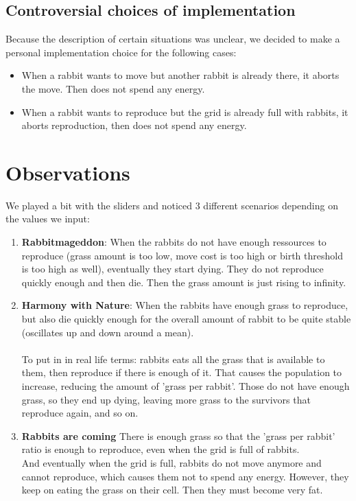 \documentclass[fontsize=11pt]{scrartcl} %
\begin{document}
\subsection*{Controversial choices of implementation}

Because the description of certain situations was unclear, we decided to make a personal implementation choice for the following cases:

\begin{itemize}

\item When a rabbit wants to move but another rabbit is already there, it aborts the move. Then does not spend any energy.

\item When a rabbit wants to reproduce but the grid is already full with rabbits, it aborts reproduction, then does not spend any energy.
\end{itemize}

\section*{Observations}

We played a bit with the sliders and noticed 3 different scenarios depending on the values we input:

\begin{enumerate}

\item \textbf{Rabbitmageddon}: When the rabbits do not have enough ressources to reproduce (grass amount is too low, move cost is too high or birth threshold is too high as well), eventually they start dying. They do not reproduce quickly enough and then die. Then the grass amount is just rising to infinity.

\item \textbf{Harmony with Nature}: When the rabbits have enough grass to reproduce, but also die quickly enough for the overall amount of rabbit to be quite stable (oscillates up and down around a mean). \\ \\
To put in in real life terms: rabbits eats all the grass that is available to them, then reproduce if there is enough of it. That causes the population to increase, reducing the amount of 'grass per rabbit'. Those do not have enough grass, so they end up dying, leaving more grass to the survivors that reproduce again, and so on.

\item \textbf{Rabbits are coming} There is enough grass so that the 'grass per rabbit' ratio is enough to reproduce, even when the grid is full of rabbits. \\ And eventually when the grid is full, rabbits do not move anymore and cannot reproduce, which causes them not to spend any energy. However, they keep on eating the grass on their cell. Then they must become very fat.

\end{enumerate}
\end{document}
